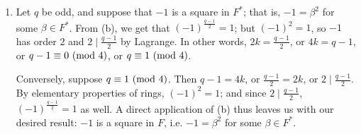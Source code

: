 \documentclass{homework}
\begin{document}
\begin{solution}
\begin{enumerate}[label=(\alph*)]
    \item Let $q$ be odd, and suppose that $-1$ is a square in $F^*$; that is, $-1=\beta^2$ for some
      $\beta\in F^*$. From (b), we get that $(-1)^{\frac{q-1}{2}}=1$; but $(-1)^2=1$, so $-1$ has
      order $2$ and $2\mid \frac{q-1}{2}$ by Lagrange. In other words, $2k=\frac{q-1}{2}$, or
      $4k=q-1$, or $q-1\equiv 0\ (\mathrm{mod}\ 4)$, or $q\equiv 1\ (\mathrm{mod}\ 4)$.
      
      Conversely, suppose $q\equiv 1\ (\mathrm{mod}\ 4)$. Then $q-1=4k$, or $\frac{q-1}{2}=2k$, or $2\mid
      \frac{q-1}{2}$.
      By elementary properties of rings, $(-1)^2=1$; and since $2\mid \frac{q-1}{2}$,
      $(-1)^{\frac{q-1}{2}}=1$ as well. A direct application of (b) thus leaves us with our desired
      result: $-1$ is a square in $F$, i.e. $-1=\beta^2$ for some $\beta\in F^*$.
  \end{enumerate}
\end{solution}
\end{document}
